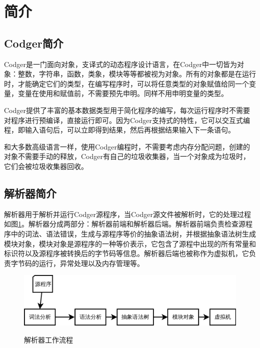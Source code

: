 

\section{简介}
\subsection{Codger简介}
Codger是一门面向对象，支译式的动态程序设计语言，在Codger中一切皆为对象：整数，字符串，函数，类象，模块等等都被视为对象。所有的对象都是在运行时，才能确定它们的类型，在编写程序时，可以将任意类型的对象赋值给同一个变量，变量在使用和赋值前，不需要预先申明。同样不用申明变量的类型。

Codger提供了丰富的基本数据类型用于简化程序的编写，每次运行程序时不需要对程序进行预编译，直接运行即可。因为Codger支持式的特性，它可以交互式编程，即输入语句后，可以立即得到结果，然后再根据结果输入下一条语句。

和大多数高级语言一样，使用Codger编程时，不需要考虑内存分配问题，创建的对象不需要手动的释放，Codger有自己的垃圾收集器，当一个对象成为垃圾时，它们会被垃圾收集器回收。



\subsection{解析器简介}
解析器用于解析并运行Codger源程序，当Codger源文件被解析时，它的处理过程如图\ref{fig:fileprocess}。解析器分成两部分：解析器前端和解析器后端。解析器前端负责检查源程序中的词法、语法错误，生成与源程序等价的抽象语法树，并根据抽象语法树生成模块对象，模块对象是源程序的一种等价表示，它包含了源程中出现的所有常量和标识符以及源程序被转换后的字节码等信息。解析器后端也被称作为虚拟机，它负责字节码的运行，异常处理以及内存管理等。


\begin{figure}
\centering
\includegraphics[scale=0.8]{file_process.png}
\label{fig:fileprocess}
\caption{解析器工作流程} 
\end{figure}


